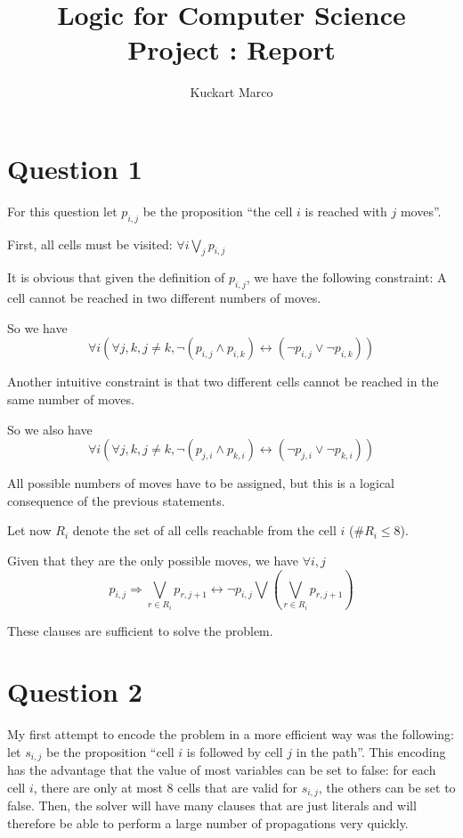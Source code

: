\documentclass[a4paper, 11pt, oneside]{article}
\title{Logic for Computer Science Project : Report}
\author{Kuckart Marco}
\date{}
\begin{document}
\maketitle

\section{Question 1}

For this question let $p_{i,j}$ be the proposition ``the cell $i$ is reached with
$j$ moves''.

First, all cells must be visited: $\forall i \bigvee_j p_{i,j}$

It is obvious that given the definition of $p_{i,j}$, we have the following
constraint: A cell cannot be reached in two different numbers of moves.

So we have
$$\forall i \left(\forall j,k,j\neq k , \lnot(p_{i,j} \land p_{i,k}) \leftrightarrow (\lnot p_{i,j} \lor \lnot p_{i,k})\right)$$

Another intuitive constraint is that two different cells cannot be reached in the
same number of moves.

So we also have
$$\forall i \left(\forall j,k,j\neq k , \lnot(p_{j,i} \land p_{k,i}) \leftrightarrow (\lnot p_{j,i} \lor \lnot p_{k,i})\right)$$

All possible numbers of moves have to be assigned, but this is a logical consequence
of the previous statements.

Let now $R_i$ denote the set of all cells reachable from the cell $i$ ($\# R_i \leq 8$).

Given that they are the only possible moves, we have $\forall i, j$
$$p_{i,j} \Rightarrow \bigvee_{r\in R_i} p_{r,j+1}
\leftrightarrow
\lnot p_{i,j} \bigvee \left(\bigvee_{r\in R_i} p_{r,j+1}\right)$$

These clauses are sufficient to solve the problem.

\section{Question 2}

My first attempt to encode the problem in a more efficient way was the following:
let $s_{i,j}$ be the proposition ``cell $i$ is followed by cell $j$ in the path''.
This encoding has the advantage that the value of most variables can be set to false:
for each cell $i$, there are only at most 8 cells that are valid for $s_{i,j}$, the
others can be set to false.
Then, the solver will have many clauses that are just literals and will therefore
be able to perform a large number of propagations very quickly.
\end{document}
